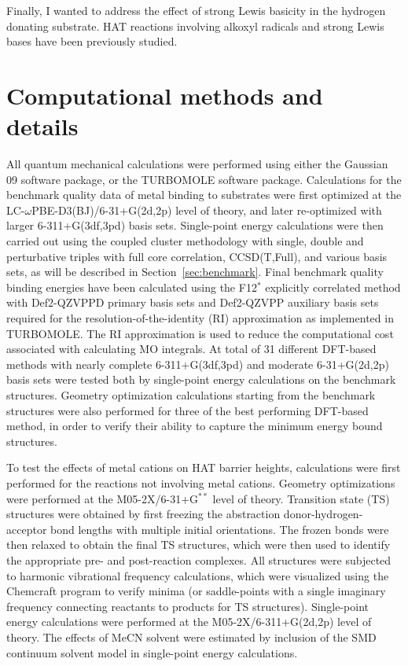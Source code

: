 Finally, I wanted to address the effect of strong Lewis basicity in the hydrogen donating substrate. HAT reactions involving alkoxyl radicals and strong Lewis bases have been previously studied.%



\section{Computational methods and details}

All quantum mechanical calculations were performed using either the Gaussian 09 software package,\cite{Frisch2009} or the TURBOMOLE software package.\cite{turbomole} Calculations for the benchmark quality data of metal binding to substrates were first optimized at the LC-$\omega$PBE-D3(BJ)/6-31+G(2d,2p) level of theory,\cite{Vydrov2006, Vydrov2006a, Grimme2010, Johnson2006} and later re-optimized with larger 6-311+G(3df,3pd) basis sets. Single-point energy calculations were then carried out using the coupled cluster methodology with single, double and perturbative triples with full core correlation, CCSD(T,Full), and various basis sets, as will be described in Section~\ref{sec:benchmark}. Final benchmark quality binding energies have been calculated using the F12$^*$ explicitly correlated method with Def2-QZVPPD primary basis sets and Def2-QZVPP auxiliary basis sets required for the resolution-of-the-identity (RI) approximation as implemented in TURBOMOLE. The RI approximation is used to reduce the computational cost associated with calculating MO integrals. At total of 31 different DFT-based methods with nearly complete 6-311+G(3df,3pd) and moderate 6-31+G(2d,2p) basis sets were tested both by single-point energy calculations on the benchmark structures. Geometry optimization calculations starting from the benchmark structures were also performed for three of the best performing DFT-based method, in order to verify their ability to capture the minimum energy bound structures.

To test the effects of metal cations on HAT barrier heights, calculations were first performed for the reactions not involving metal cations. Geometry optimizations were performed at the M05-2X\cite{Zhao2006}/6-31+G$^{**}$ level of theory. Transition state (TS) structures were obtained by first freezing the abstraction donor-hydrogen-acceptor bond lengths with multiple initial orientations. The frozen bonds were then relaxed to obtain the final TS structures, which were then used to identify the appropriate pre- and post-reaction complexes. All structures were subjected to harmonic vibrational frequency calculations, which were visualized using the Chemcraft program\cite{ccraft} to verify minima (or saddle-points with a single imaginary frequency connecting reactants to products for TS structures). Single-point energy calculations were performed at the M05-2X/6-311+G(2d,2p) level of theory. The effects of MeCN solvent were estimated by inclusion of the SMD\cite{Marenich2009} continuum solvent model in single-point energy calculations.

